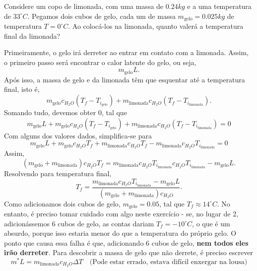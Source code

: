 \documentclass[PhysicsII/phsyicsII_notes.tex]{subfiles}
\begin{document}
\begin{example}
	Considere um copo de limonada, com uma massa de \(0.24kg\) e a uma temperatura de \(33^{\circ{}}C.\)
	Pegamos dois cubos de gelo, cada um de massa \(m_{\text{gelo}} = 0.025kg\) de temperatura \(T = 0^{\circ{}}C.\) Ao colocá-los na limonada,
	quanto valerá a temperatura final da limonada?

	Primeiramente, o gelo irá derreter ao entrar em contato com a limonada. Assim, o primeiro passo será encontrar
	o calor latente do gelo, ou seja,
	\[
		m_{\text{gelo}}L.
	\]
	Após isso, a massa de gelo e da limonada têm que esquentar até a temperatura final, isto é,
	\[
		m_{\text{gelo}}c_{H_{2}O}(T_{f} - T_{i_{\text{gelo}}}) + m_{\text{limonada}}c_{H_{2}O}(T_{f}-T_{i_{\text{limonada}}}).
	\]
	Somando tudo, devemos obter 0, tal que
	\[
		m_{\text{gelo}}L + m_{\text{gelo}}c_{H_{2}O}(T_{f} - T_{i_{\text{gelo}}}) + m_{\text{limonada}}c_{H_{2}O}(T_{f}-T_{i_{\text{limonada}}}) = 0
	\]
	Com alguns dos valores dados, simplifica-se para
	\[
		m_{\text{gelo}}L + m_{\text{gelo}}c_{H_{2}O}T_{f} + m_{\text{limonada}}c_{H_{2}O}T_{f} - m_{\text{limonada}}c_{H_{2}O}T_{i_{\text{limonada}}} = 0
	\]
	Assim,
	\[
		(m_{\text{gelo}}+m_{\text{limonada}})c_{H_{2}O}T_{f} = m_{\text{limonada}}c_{H_{2}O}T_{i_{\text{limonada}}}c_{H_{2}O}T_{i_{\text{limonada}}} - m_{\text{gelo}}L.
	\]
	Resolvendo para temperatura final,
	\[
		T_{f} = \frac{m_{\text{limonada}}c_{H_{2}O}T_{i_{\text{limonada}}} - m_{\text{gelo}}L}{(m_{\text{gelo}}+m_{\text{limonada}})c_{H_{2}O}}.
	\]
	Como adicionamos dois cubos de gelo, \(m_{\text{gelo}} = 0.05\), tal que \(T_{f}\approx 14^{\circ{}}C\). No entanto, é preciso tomar cuidado com algo neste exercício -
	se, no lugar de 2, adicionássemos 6 cubos de gelo, as contas dariam \(T_{f} = -10^{\circ{}}C\), o que é um absurdo, porque isso estaria menor do que
	a temperatura do próprio gelo. O ponto que causa essa falha é que, adicionando 6 cubos de gelo, \textbf{nem todos eles irão derreter}. Para
	descobrir a massa de gelo que não derrete, é preciso escrever
	\[
		m^{*}L = m_{\text{limonada}}c_{H_{2}O}\Delta T\quad \text{(Pode estar errado, estava difícil enxergar na lousa)}
	\]
\end{example}
\end{document}
